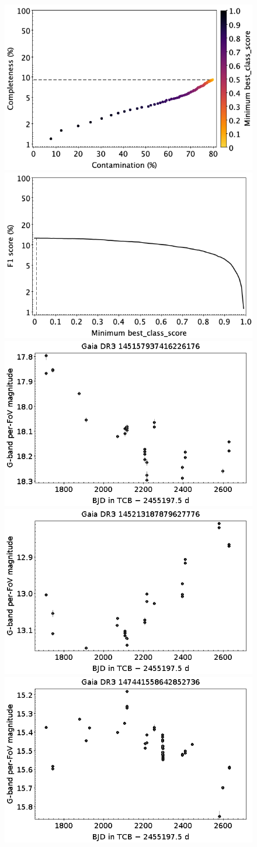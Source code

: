 \documentclass[longauth]{aa}
\begin{document}
\begin{appendix}
\begin{figure}
\centering
{} \includegraphics[width=0.45\hsize]{figures/appendix/YSO_cls_scc.png}  
\hspace{2mm}
 \includegraphics[width=0.45\hsize]{figures/appendix/YSO_cls_sf1.png} \\ 
\vspace{4mm}
 \includegraphics[width=0.45\hsize]{figures/appendix/YSO-13.png}  
\hspace{2mm}
 \includegraphics[width=0.45\hsize]{figures/appendix/YSO-17.png} \\
\vspace{4mm}
 \includegraphics[width=0.45\hsize]{figures/appendix/YSO-37.png}  

\end{figure}
\end{appendix}
\end{document}
